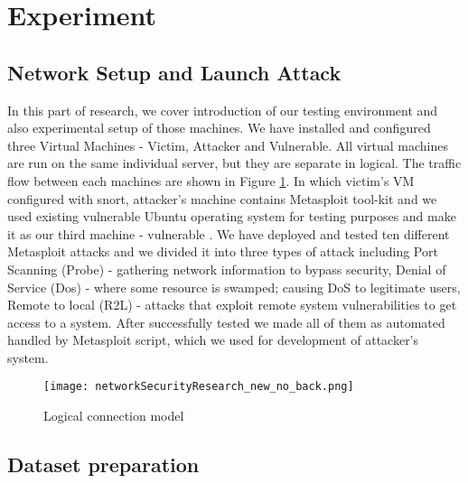 \section{Experiment}
\label{experiment}


\subsection{Network Setup and Launch Attack}

In this part of research, we cover introduction of our testing environment and also experimental setup of those machines. We have installed and configured three Virtual Machines - Victim, Attacker and Vulnerable. All virtual machines are run on the same individual server, but they are separate in logical. The traffic flow between each machines are shown in Figure \ref{fig:connectionModel}. In which victim's VM configured with snort, attacker's machine contains Metasploit tool-kit and we used existing vulnerable Ubuntu operating system for testing purposes and make it as our third machine - vulnerable \cite{misc:metasploitable}. We have deployed and tested ten different Metasploit attacks and we divided it into three types of attack including Port Scanning (Probe) - gathering network information to bypass security, Denial of Service (Dos) - where some resource is swamped; causing DoS to legitimate users, Remote to local (R2L) - attacks that exploit remote system vulnerabilities to get access to a system. After successfully tested we made all of them as automated handled by Metasploit script, which we used for development of attacker's system\cite{misc:metasploitScripts}.


\begin{figure}[h!]
	\texttt{[image: networkSecurityResearch\_new\_no\_back.png]}
	\caption{Logical connection model}
	\label{fig:connectionModel}
\end{figure}

\subsection{Dataset preparation}


